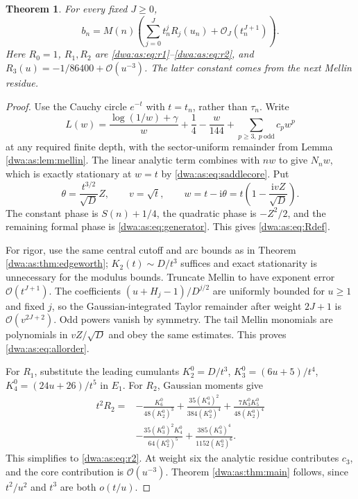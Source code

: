 \documentclass[11pt,letterpaper]{article}
\numberwithin{equation}{section}
\newtheorem{theorem}{Theorem}[section]
\theoremstyle{remark}
\newcommand{\ii}{\mathrm i}
\newcommand{\OO}{\mathcal O}
\begin{document}
\begin{theorem}\label{dwa:as:thm:explicit}
For every fixed $J\ge0$,
\begin{equation}\label{dwa:as:eq:allorder}
 b_n=M(n)\left(\sum_{j=0}^Jt_n^jR_j(u_n)+\OO_J(t_n^{J+1})\right).
\end{equation}
Here $R_0=1$, $R_1,R_2$ are \eqref{dwa:as:eq:r1}--\eqref{dwa:as:eq:r2}, and $R_3(u)=-1/86400+\OO(u^{-3})$. The latter constant comes from the next Mellin residue.
\end{theorem}
\begin{proof}
Use the Cauchy circle $e^{-t}$ with $t=t_n$, rather than $\tau_n$. Write
\[
 L(w)=\frac{\log(1/w)+\gamma}{w}+\frac14-\frac{w}{144}
        +\sum_{p\ge3,\ p\ \mathrm{odd}}c_pw^p
\]
at any required finite depth, with the sector-uniform remainder from Lemma \ref{dwa:as:lem:mellin}. The linear analytic term combines with $nw$ to give $N_nw$, which is exactly stationary at $w=t$ by \eqref{dwa:as:eq:saddlecore}. Put
\[
 \theta=\frac{t^{3/2}}{\sqrt D}Z,\qquad v=\sqrt t,
 \qquad w=t-\ii\theta=t\left(1-\frac{\ii vZ}{\sqrt D}\right).
\]
The constant phase is $S(n)+1/4$, the quadratic phase is $-Z^2/2$, and the remaining formal phase is \eqref{dwa:as:eq:generator}. This gives \eqref{dwa:as:eq:Rdef}.

For rigor, use the same central cutoff and arc bounds as in Theorem \ref{dwa:as:thm:edgeworth}; $K_2(t)\sim D/t^3$ suffices and exact stationarity is unnecessary for the modulus bounds. Truncate Mellin to have exponent error $\OO(t^{J+1})$. The coefficients $(u+H_j-1)/D^{j/2}$ are uniformly bounded for $u\ge1$ and fixed $j$, so the Gaussian-integrated Taylor remainder after weight $2J+1$ is $\OO(v^{2J+2})$. Odd powers vanish by symmetry. The tail Mellin monomials are polynomials in $vZ/\sqrt D$ and obey the same estimates. This proves \eqref{dwa:as:eq:allorder}.

For $R_1$, substitute the leading cumulants
$K_2^0=D/t^3$, $K_3^0=(6u+5)/t^4$, $K_4^0=(24u+26)/t^5$ in $E_1$. For $R_2$, Gaussian moments give
\begin{align*}
 t^2R_2={}&-\frac{K_6^0}{48(K_2^0)^3}
 +\frac{35(K_4^0)^2}{384(K_2^0)^4}
 +\frac{7K_3^0K_5^0}{48(K_2^0)^4}\\
 &-\frac{35(K_3^0)^2K_4^0}{64(K_2^0)^5}
 +\frac{385(K_3^0)^4}{1152(K_2^0)^6}.
\end{align*}
This simplifies to \eqref{dwa:as:eq:r2}. At weight six the analytic residue contributes $c_3$, and the core contribution is $\OO(u^{-3})$. Theorem \ref{dwa:as:thm:main} follows, since $t^2/u^2$ and $t^3$ are both $o(t/u)$.
\end{proof}
\end{document}
